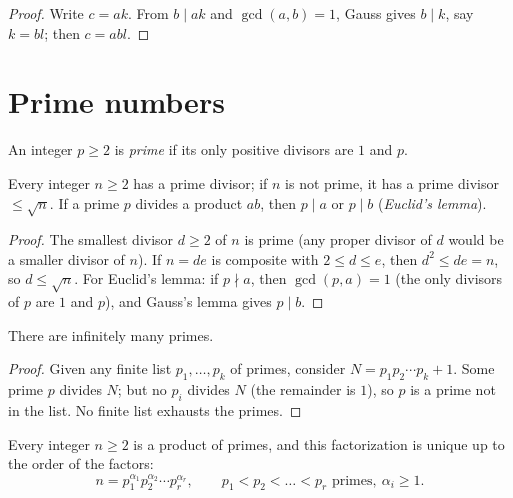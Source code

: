 \begin{proof}
Write $c = ak$. From $b \mid ak$ and $\gcd(a,b)=1$, Gauss gives
$b \mid k$, say $k = bl$; then $c = abl$.
\end{proof}

\section{Prime numbers}

\begin{definition}[Prime]\label{def:tle:arith:prime}
An integer $p \geq 2$ is \emph{prime} if its only
positive divisors are $1$ and $p$.
\end{definition}

\begin{proposition}\label{prop:tle:arith:primedivides}
Every integer $n \geq 2$ has a prime divisor; if $n$ is not prime, it has a
prime divisor $\leq \sqrt n$. If a prime $p$ divides a product $ab$, then
$p \mid a$ or $p \mid b$ (\emph{Euclid's lemma}).
\end{proposition}

\begin{proof}
The smallest divisor $d \geq 2$ of $n$ is prime (any proper divisor of $d$
would be a smaller divisor of $n$). If $n = de$ is composite with
$2 \leq d \leq e$, then $d^2 \leq de = n$, so $d \leq \sqrt n$. For Euclid's
lemma: if $p \nmid a$, then $\gcd(p, a) = 1$ (the only divisors of $p$ are
$1$ and $p$), and Gauss's lemma gives $p \mid b$.
\end{proof}

\begin{theorem}[Euclid]\label{thm:tle:arith:infiniteprimes}
There are infinitely many primes.
\end{theorem}

\begin{proof}
Given any finite list $p_1, \dots, p_k$ of primes, consider
$N = p_1 p_2 \cdots p_k + 1$. Some prime $p$ divides $N$; but no $p_i$
divides $N$ (the remainder is $1$), so $p$ is a prime not in the list. No
finite list exhausts the primes.
\end{proof}

\begin{theorem}\label{thm:tle:arith:fta}
Every integer $n \geq 2$ is a product of primes, and this factorization is
unique up to the order of the factors:
\[
n = p_1^{\alpha_1} p_2^{\alpha_2} \cdots p_r^{\alpha_r},
\qquad p_1 < p_2 < \dots < p_r \text{ primes},\ \alpha_i \geq 1 .
\]
\end{theorem}

